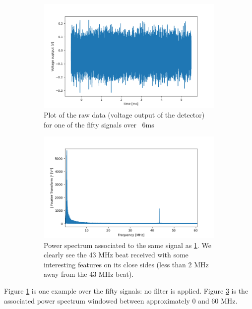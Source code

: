 \documentclass[11pt]{report}
\begin{document}
\begin{figure}[h!]
\centering
\begin{subfigure}{.48\textwidth}
  \centering
  \includegraphics[width=1.1\linewidth]{sp-f-rough}
  \caption{Plot of the raw data (voltage output of the detector) for one of the fifty signals over ~6ms}
  \label{fig:sp-f-rough}
\end{subfigure}%
\hspace{1em}%
\begin{subfigure}{.48\textwidth}
  \centering
  \includegraphics[width=1.1\linewidth]{sp-fft-rough}
  \caption{Power spectrum associated to the same signal as \ref{fig:sp-f-rough}. We clearly see the 43 MHz beat received with some interesting features on its close sides (less than 2 MHz away from the 43 MHz beat).}
  \label{fig:sp-fft-rough}
\end{subfigure}
\caption{}
\end{figure}

Figure \ref{fig:sp-f-rough} is one example over the fifty signals: no filter is applied. Figure \ref{fig:sp-fft-rough} is the associated power spectrum windowed between approximately 0 and 60 MHz.
\end{document}
